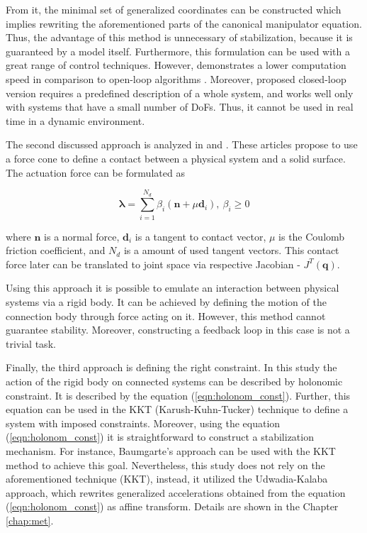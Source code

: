 From it, the minimal set of generalized coordinates can be constructed which
implies rewriting the aforementioned parts of the canonical manipulator equation.
Thus, the advantage of this method is unnecessary of stabilization, because
it is guaranteed by a model itself. Furthermore, this formulation can be
used with a great range of control techniques. However, \cite{BodyDynWithClosedLoop}
demonstrates a lower computation speed in comparison to
open-loop algorithms \cite{Pinocchio}. Moreover, proposed closed-loop
version requires a predefined description of a whole system, and works well
only with systems that have a small number of DoFs. Thus, it cannot
be used in real time in a dynamic environment.


The second discussed approach is analyzed in \cite{OptimizationBasedLocomotionPlanning}
and \cite{WholeBodyControlForm}. These articles propose to use a
force cone to define a contact between a physical system
and a solid surface. The actuation force can be formulated as


\begin{equation}
   \label{eqn:force_cone}
   \pmb{\lambda} = \sum_{i=1}^{N_d} \beta_i (\mathbf{n} + \mu \mathbf{d}_i),
   \: \beta_i \ge 0
\end{equation}


where $\mathbf{n}$ is a normal force, $\mathbf{d}_i$ is a tangent to contact
vector, $\mu$ is the Coulomb friction coefficient, and $N_d$ is a amount
of used tangent vectors. This contact force later can be translated to
joint space via respective Jacobian - $J^T(\mathbf{q})$.


Using this approach it is possible to emulate an interaction between
physical systems via a rigid body. It can be achieved by defining the motion
of the connection body through force acting on it. However, this method cannot
guarantee stability. Moreover, constructing a feedback loop in this case is
not a trivial task.


Finally, the third approach is defining the right constraint. In this study the action
of the rigid body on connected systems can be described by holonomic constraint.
It is described by the equation (\ref{eqn:holonom_const}).
Further, this equation can be used in the KKT (Karush-Kuhn-Tucker) technique to
define a system with imposed constraints. Moreover, using the equation
(\ref{eqn:holonom_const}) it is straightforward to construct a stabilization
mechanism. For instance, Baumgarte's approach can be used with the KKT method
to achieve this goal. Nevertheless, this study does not rely on the aforementioned
technique (KKT), instead, it utilized the Udwadia-Kalaba approach, which
rewrites generalized accelerations obtained from the equation
(\ref{eqn:holonom_const}) as affine transform. Details are shown in the
Chapter \ref{chap:met}.



